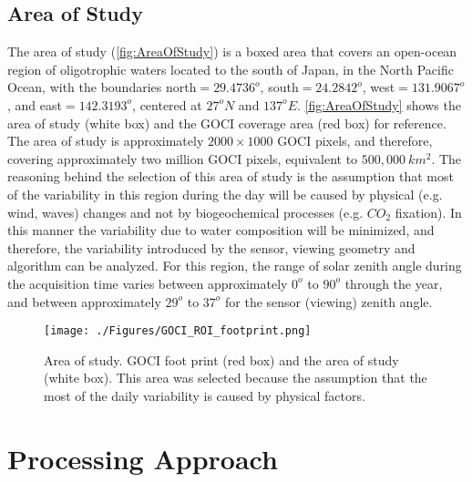 \documentclass[onecolumn,3p,letterpaper,11pt]{elsarticle}
\begin{document}
\subsection{Area of Study}

The area of study (\autoref{fig:AreaOfStudy}) is a boxed area that covers an open-ocean region of oligotrophic waters located to the south of Japan, in the North Pacific Ocean, with the boundaries north$=29.4736^o$, south$=24.2842^o$, west$=131.9067^o$, and east$=142.3193^o$, centered at $27^oN$ and $137^oE$. \autoref{fig:AreaOfStudy} shows the area of study (white box) and the GOCI coverage area (red box) for reference. The area of study is approximately $2000\times 1000$ GOCI pixels, and therefore, covering approximately two million GOCI pixels, equivalent to $500,000\ km^2$. The reasoning behind the selection of this area of study is the assumption that most of the variability in this region during the day will be caused by physical (e.g. wind, waves) changes and not by biogeochemical processes (e.g. $CO_2$ fixation). In this manner the variability due to water composition will be minimized, and therefore, the variability introduced by the sensor, viewing geometry and algorithm can be analyzed. For this region, the range of solar zenith angle during the acquisition time  varies between approximately $0^o$ to $90^o$ through the year, and between approximately $29^o$ to $37^o$ for the sensor (viewing) zenith angle.

\begin{figure}[ht]
	\centering
    \texttt{[image: ./Figures/GOCI\_ROI\_footprint.png]}
	\internallinenumbers
  \caption{Area of study. GOCI foot print (red box) and the area of study (white box). This area was selected because the assumption that the most of the daily variability is caused by physical factors.}
	\label{fig:AreaOfStudy}
\end{figure}
\section{Processing Approach}
\label{sec:processing}
\end{document}
